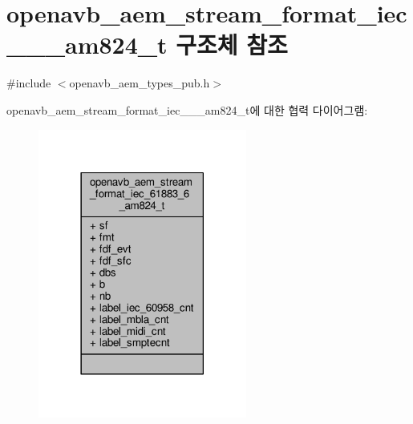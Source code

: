 \hypertarget{structopenavb__aem__stream__format__iec__61883__6__am824__t}{}\section{openavb\+\_\+aem\+\_\+stream\+\_\+format\+\_\+iec\+\_\+\_\+\_\+am824\+\_\+t 구조체 참조}
\label{structopenavb__aem__stream__format__iec__61883__6__am824__t}


{\ttfamily \#include $<$openavb\+\_\+aem\+\_\+types\+\_\+pub.\+h$>$}



openavb\+\_\+aem\+\_\+stream\+\_\+format\+\_\+iec\+\_\+\_\+\_\+am824\+\_\+t에 대한 협력 다이어그램\+:
\nopagebreak
\begin{figure}[H]
\begin{center}
\leavevmode
\includegraphics[width=194pt]{structopenavb__aem__stream__format__iec__61883__6__am824__t__coll__graph}
\end{center}
\end{figure}
